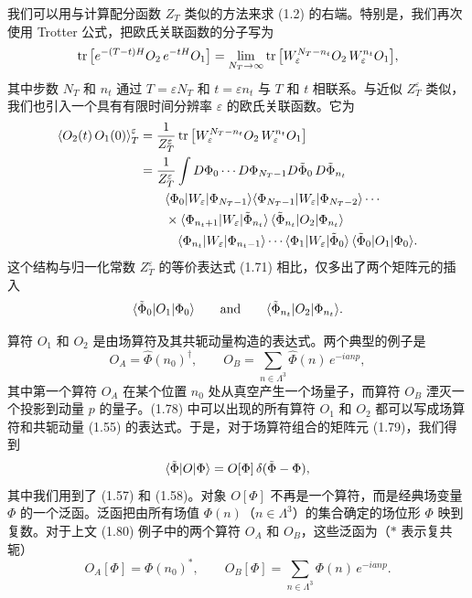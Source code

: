 我们可以用与计算配分函数 $Z_T$ 类似的方法来求 (1.2) 的右端。特别是，我们再次使用 Trotter 公式，把欧氏关联函数的分子写为
\begin{equation}
  \operatorname{tr}\big[e^{-(T-t)H}O_2\,e^{-tH}O_1\big]
  = \lim_{N_T\to\infty}\operatorname{tr}\big[W_\varepsilon^{N_T-n_t}O_2\,W_\varepsilon^{n_t}O_1\big],
\end{equation}
其中步数 $N_T$ 和 $n_t$ 通过 $T = \varepsilon N_T$ 和 $t = \varepsilon n_t$ 与 $T$ 和 $t$ 相联系。与近似 $Z_T^\varepsilon$ 类似，我们也引入一个具有有限时间分辨率 $\varepsilon$ 的欧氏关联函数。它为
\begin{align}
  \left\langle O_2(t)\,O_1(0) \right\rangle_T^\varepsilon
  &= \frac{1}{Z_T^\varepsilon}\operatorname{tr}\big[W_\varepsilon^{N_T-n_t}O_2\,W_\varepsilon^{n_t}O_1\big] \notag\\
  &= \frac{1}{Z_T^\varepsilon}\int D\Phi_0\cdots D\Phi_{N_T-1}
     D\tilde{\Phi}_0\,D\tilde{\Phi}_{n_t}\, \notag\\
  &\qquad \langle\Phi_0|W_\varepsilon|\Phi_{N_T-1}\rangle
     \langle\Phi_{N_T-1}|W_\varepsilon|\Phi_{N_T-2}\rangle\cdots \notag\\
  &\qquad \times \langle\Phi_{n_t+1}|W_\varepsilon|\tilde{\Phi}_{n_t}\rangle\,
     \langle\tilde{\Phi}_{n_t}|O_2|\Phi_{n_t}\rangle \notag\\
  &\qquad\quad \langle\Phi_{n_t}|W_\varepsilon|\Phi_{n_t-1}\rangle\cdots
     \langle\Phi_1|W_\varepsilon|\tilde{\Phi}_0\rangle\,
     \langle\tilde{\Phi}_0|O_1|\Phi_0\rangle.
\end{align}
这个结构与归一化常数 $Z_T^\varepsilon$ 的等价表达式 (1.71) 相比，仅多出了两个矩阵元的插入
\begin{equation}
  \langle\tilde{\Phi}_0|O_1|\Phi_0\rangle
  \qquad \text{and} \qquad
  \langle\tilde{\Phi}_{n_t}|O_2|\Phi_{n_t}\rangle.
\end{equation}

算符 $O_1$ 和 $O_2$ 是由场算符及其共轭动量构造的表达式。两个典型的例子是
\begin{equation}
  O_A = \hat{\Phi}(n_0)^\dagger, \qquad
  O_B = \sum_{n\in\Lambda^3}\hat{\Phi}(n)\,e^{-ianp},
\end{equation}
其中第一个算符 $O_A$ 在某个位置 $n_0$ 处从真空产生一个场量子，而算符 $O_B$ 湮灭一个投影到动量 $p$ 的量子。(1.78) 中可以出现的所有算符 $O_1$ 和 $O_2$ 都可以写成场算符和共轭动量 (1.55) 的表达式。于是，对于场算符组合的矩阵元 (1.79)，我们得到
\begin{equation}
  \langle\tilde{\Phi}|O|\Phi\rangle = O[\Phi]\,\delta(\tilde{\Phi} - \Phi),
\end{equation}
其中我们用到了 (1.57) 和 (1.58)。对象 $O[\Phi]$ 不再是一个算符，而是经典场变量 $\Phi$ 的一个泛函。泛函把由所有场值 $\Phi(n)$（$n \in \Lambda^3$）的集合确定的场位形 $\Phi$ 映到复数。对于上文 (1.80) 例子中的两个算符 $O_A$ 和 $O_B$，这些泛函为（$*$ 表示复共轭）
\begin{equation}
  O_A[\Phi] = \Phi(n_0)^*, \qquad
  O_B[\Phi] = \sum_{n\in\Lambda^3}\Phi(n)\,e^{-ianp}.
\end{equation}

